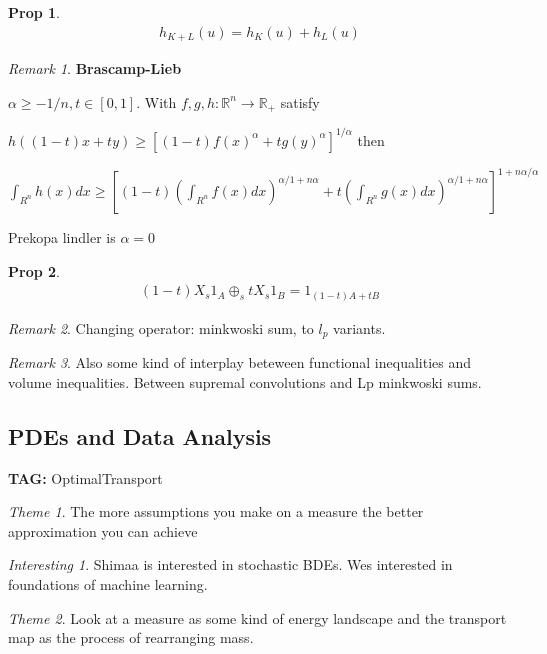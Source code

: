 \documentclass[11pt]{article}
\newtheorem{prop}{Prop}
\theoremstyle{remark}
\newtheorem{remark}{Remark}
\newtheorem{interest}{Interesting}
\newtheorem{theme}{Theme}
\begin{document}
\begin{prop}
	\begin{align*}
		h_{K+L}(u) = h_K(u) + h_L(u)
	\end{align*}
\end{prop}

\begin{remark}
	\textbf{Brascamp-Lieb}

	$\alpha \geq -1/n, t\in [0,1]$. With $f,g,h : \mathbb{R}^n \to \mathbb{R}_+$ satisfy

$h((1-t)x + ty) \geq [(1-t)f(x)^{\alpha} + tg(y)^{\alpha}]^{1/\alpha}$ then

$\int_{R^n} h(x)dx \geq [(1-t)(\int_{R^n}f(x)dx)^{\alpha/1+n\alpha}+t(\int_{R^n}g(x)dx)^{\alpha/1+n\alpha}]^{1+n\alpha/\alpha}$

Prekopa lindler is $\alpha = 0$
\end{remark}

\begin{prop}
	\begin{align*}
		(1-t)X_s1_A \oplus_s t X_s 1_B = 1_{(1-t)A + tB}
	\end{align*}
\end{prop}

\begin{remark}
	Changing operator: minkwoski sum, to $l_p$ variants. 
\end{remark}

\begin{remark}
	Also some kind of interplay beteween functional inequalities and volume inequalities. Between supremal convolutions and Lp minkwoski sums.
\end{remark}

\subsection{PDEs and Data Analysis}

\textbf{TAG:} OptimalTransport

\begin{theme}
	The more assumptions you make on a measure the better approximation you can achieve
\end{theme}

\begin{interest}
	Shimaa is interested in stochastic BDEs. Wes interested in foundations of machine learning.
\end{interest}

\begin{theme}
	Look at a measure as some kind of energy landscape and the transport map as the process of rearranging mass.
\end{theme}
\end{document}
